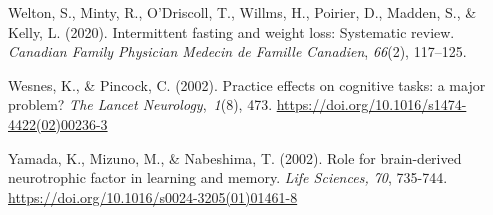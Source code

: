 \documentclass[authordate, empirical]{jote-new-article}
\begin{document}
Welton, S., Minty, R., O'Driscoll, T., Willms, H., Poirier, D., Madden, S., \& Kelly, L. (2020). Intermittent fasting and weight loss: Systematic review. \emph{Canadian Family Physician Medecin de Famille Canadien}, \emph{66}(2), 117--125.






Wesnes, K., \& Pincock, C. (2002). Practice effects on cognitive tasks: a major problem? \emph{The Lancet Neurology}, \emph{1}(8), 473. \url{https://doi.org/10.1016/s1474-4422(02)00236-3}



Yamada, K., Mizuno, M., \& Nabeshima, T. (2002). Role for brain-derived neurotrophic factor in learning and memory. \emph{Life Sciences, 70}, 735-744. \url{https://doi.org/10.1016/s0024-3205(01)01461-8}









\end{document}
